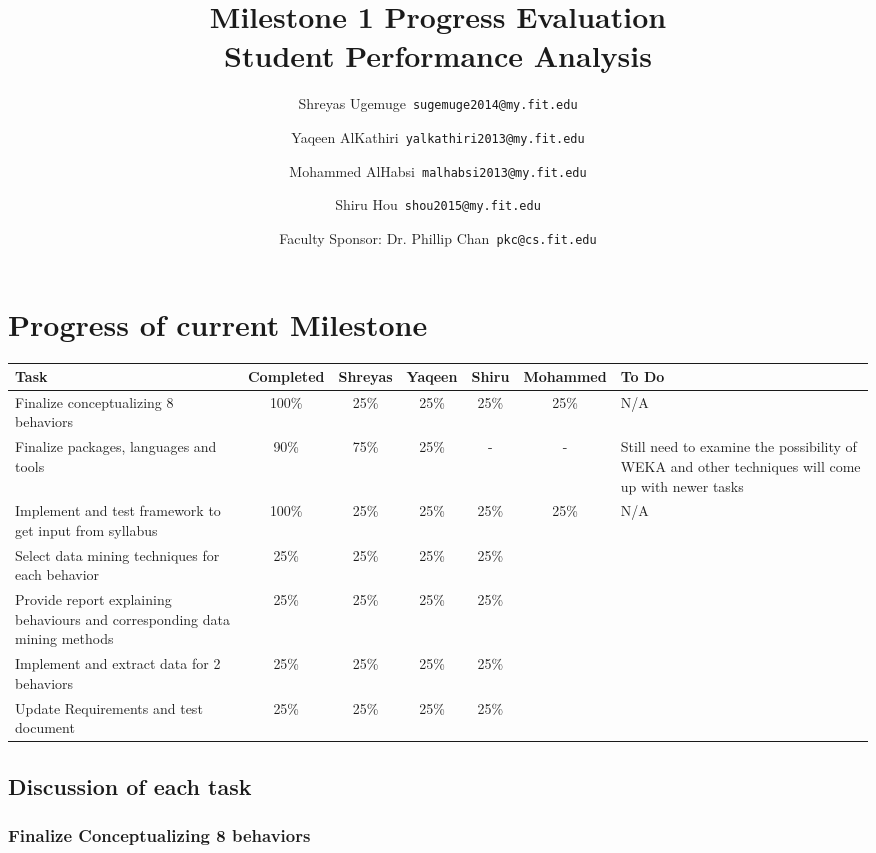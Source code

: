\documentclass[12pt]{article}
\begin{document}
	\title{\textbf{Milestone 1 Progress Evaluation} \\ \hfill \break
	Student Performance Analysis}
	\author{Shreyas Ugemuge\      \texttt{sugemuge2014@my.fit.edu}
  \and
  Yaqeen AlKathiri\      \texttt{yalkathiri2013@my.fit.edu}
  \and
	Mohammed AlHabsi\      \texttt{malhabsi2013@my.fit.edu}
  \and
  Shiru Hou\      \texttt{shou2015@my.fit.edu}
  \and
  Faculty Sponsor: Dr. Phillip Chan\      \texttt{pkc@cs.fit.edu}}
	\maketitle
	\pagebreak
	\singlespacing
	\tableofcontents
	\pagebreak
	\section{Progress of current Milestone}
	
	\begin{tabularx}{\textwidth}{|X|c|c|c|c|c|X|}
	\hline
		\textbf{Task} & \textbf{Completed} &\textbf{Shreyas} & \textbf{Yaqeen} & \textbf{Shiru} & \textbf{Mohammed} & \textbf{To Do}  \\
		\hline
		Finalize conceptualizing 8 behaviors & 100\% & 25\% & 25\% & 25\% & 25\% & N/A \\ \hline
		Finalize packages, languages and tools & 90\% & 75\% & 25\% & - & - & Still need to examine the possibility of WEKA and other techniques will come up with newer tasks\\ \hline
		Implement and test framework to get input from syllabus & 100\% & 25\% & 25\% & 25\% & 25\% & N/A \\ \hline
		Select data mining techniques for each behavior & 25\% & 25\% & 25\% & 25\% \\ \hline
		Provide report explaining behaviours and corresponding data mining methods &25\% & 25\% & 25\% & 25\%\\ \hline
		Implement and extract data for 2 behaviors &25\% & 25\% & 25\% & 25\%\\ \hline
		Update Requirements and test document & 25\% & 25\% & 25\% & 25\%\\ 
		\hline
	\end{tabularx}

	\subsection{Discussion of each task}
		\subsubsection{Finalize Conceptualizing 8 behaviors}
\end{document}
